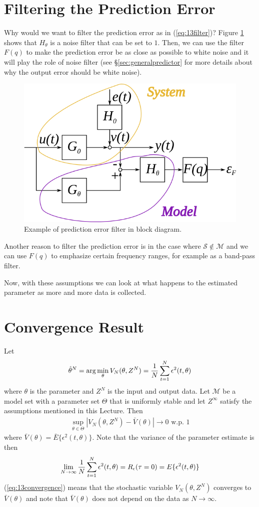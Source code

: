 \section{Filtering the Prediction Error}
Why would we want to filter the prediction error as in (\ref{eq:13filter})? Figure \ref{fig:13errorfilter} shows that $H_\theta$ is a noise filter that can be set to $1$. Then, we can use the filter $F(q)$ to make the prediction error be as close as possible to white noise and it will play the role of noise filter (see \S\ref{sec:generalpredictor} for more details about why the output error should be white noise).

\begin{figure}[ht!]
	\centering
	\includegraphics[width=.5\textwidth]{images/13errorfilter}
	\caption{Example of prediction error filter in block diagram.}
	\label{fig:13errorfilter}
\end{figure}

Another reason to filter the prediction error is in the case where $\mathcal{S}\notin\mathcal{M}$ and we can use $F(q)$ to emphasize certain frequency ranges, for example as a band-pass filter.

Now, with these assumptions we can look at what happens to the estimated parameter as more and more data is collected.

\section{Convergence Result}
\label{sec:convergence}
Let
$$\hat{\theta}^N = \arg\min_\theta V_N(\theta,Z^N) = \frac{1}{N}\sum_{t=1}^N\epsilon^2(t,\theta)$$
where $\theta$ is the parameter and $Z^N$ is the input and output data. Let $\mathcal{M}$ be a model set with a parameter set $\Theta$ that is uniformly stable and let $Z^\infty$ satisfy the assumptions mentioned in this Lecture. Then
\begin{align}
\label{eq:13convergence}
\sup_{\theta\in\Theta}\left|V_N(\theta,Z^N)-\bar{V}(\theta)\right| \to 0 \text{ w.p. } 1
\end{align}
where $\bar{V}(\theta)=\bar{E}\{\epsilon^2(t,\theta)\}$. Note that the variance of the parameter estimate is then
$$\lim_{N\to\infty}\frac{1}{N}\sum_{t=1}^N\epsilon^2(t,\theta) = R_\epsilon(\tau=0) = E\{\epsilon^2(t,\theta)\}$$
(\ref{eq:13convergence}) means that the stochastic variable $V_N(\theta,Z^N)$ converges to $\bar{V}(\theta)$ and note that $\bar{V}(\theta)$ does not depend on the data as $N\to\infty$.

